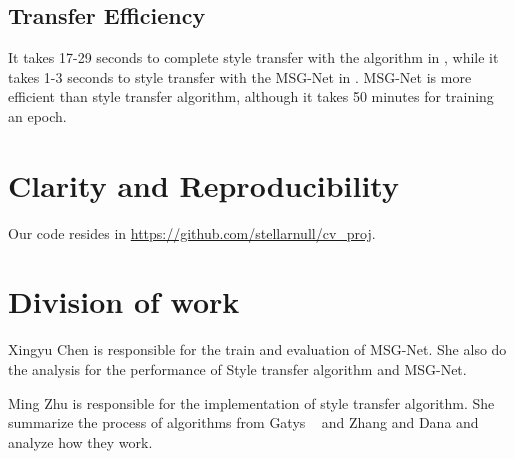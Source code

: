 \documentclass[10pt,twocolumn,letterpaper]{article}
\begin{document}
\subsection{Transfer Efficiency}
It takes 17-29 seconds to complete style transfer with the algorithm in \cite{Authors01}, while it takes 1-3 seconds to style transfer with the MSG-Net in \cite{Authors04}. MSG-Net is more efficient than style transfer algorithm, although it takes 50 minutes for training an epoch.


\section{Clarity and Reproducibility}
Our code resides in \url{https://github.com/stellarnull/cv_proj}.


\section{Division of work}
Xingyu Chen is responsible for the train and evaluation of MSG-Net. She also do the analysis for the performance of Style transfer algorithm and MSG-Net.

Ming Zhu is responsible for the implementation of style transfer algorithm. She summarize the process of algorithms from Gatys \etal~\cite{Authors01} and Zhang and Dana \cite{Authors04} and analyze how they work.

{\small


}
\end{document}

